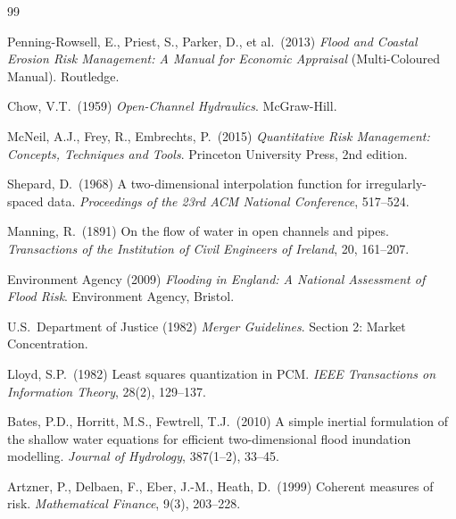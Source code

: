 \documentclass[11pt,a4paper]{article}
\begin{document}
\clearpage
\begin{thebibliography}{99}

 Penning-Rowsell, E., Priest, S., Parker, D., et al.\ (2013)
    \textit{Flood and Coastal Erosion Risk Management: A Manual for Economic Appraisal}
    (Multi-Coloured Manual). Routledge.

 Chow, V.T.\ (1959)
    \textit{Open-Channel Hydraulics}. McGraw-Hill.

 McNeil, A.J., Frey, R., Embrechts, P.\ (2015)
    \textit{Quantitative Risk Management: Concepts, Techniques and Tools}.
    Princeton University Press, 2nd edition.

 Shepard, D.\ (1968)
    A two-dimensional interpolation function for irregularly-spaced data.
    \textit{Proceedings of the 23rd ACM National Conference}, 517--524.

 Manning, R.\ (1891)
    On the flow of water in open channels and pipes.
    \textit{Transactions of the Institution of Civil Engineers of Ireland}, 20, 161--207.

 Environment Agency (2009)
    \textit{Flooding in England: A National Assessment of Flood Risk}.
    Environment Agency, Bristol.

 U.S.\ Department of Justice (1982)
    \textit{Merger Guidelines}. Section 2: Market Concentration.

 Lloyd, S.P.\ (1982)
    Least squares quantization in PCM.
    \textit{IEEE Transactions on Information Theory}, 28(2), 129--137.

 Bates, P.D., Horritt, M.S., Fewtrell, T.J.\ (2010)
    A simple inertial formulation of the shallow water equations for efficient
    two-dimensional flood inundation modelling.
    \textit{Journal of Hydrology}, 387(1--2), 33--45.

 Artzner, P., Delbaen, F., Eber, J.-M., Heath, D.\ (1999)
    Coherent measures of risk. \textit{Mathematical Finance}, 9(3), 203--228.

\end{thebibliography}
\end{document}

